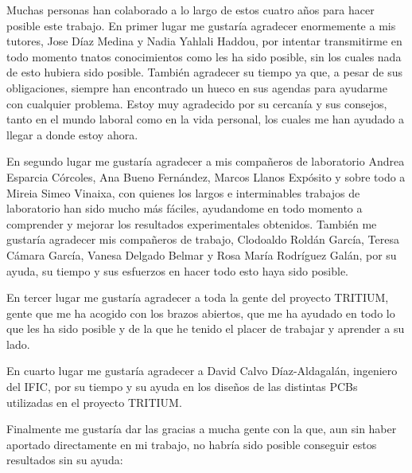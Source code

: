 Muchas personas han colaborado a lo largo de estos cuatro años para hacer posible este trabajo. En primer lugar me gustaría agradecer enormemente a mis tutores, Jose Díaz Medina y Nadia Yahlali Haddou, por intentar transmitirme en todo momento tnatos conocimientos como les ha sido posible, sin los cuales nada de esto hubiera sido posible. También agradecer su tiempo ya que, a pesar de sus obligaciones, siempre han encontrado un hueco en sus agendas para ayudarme con cualquier problema. Estoy muy agradecido por su cercanía y sus consejos, tanto en el mundo laboral como en la vida personal, los cuales me han ayudado a llegar a donde estoy ahora.

En segundo lugar me gustaría agradecer a mis compañeros de laboratorio Andrea Esparcia Córcoles, Ana Bueno Fernández, Marcos Llanos Expósito y sobre todo a Mireia Simeo Vinaixa, con quienes los largos e interminables trabajos de laboratorio han sido mucho más fáciles, ayudandome en todo momento a comprender y mejorar los resultados experimentales obtenidos.  También me gustaría agradecer mis compañeros de trabajo, Clodoaldo Roldán García, Teresa Cámara García, Vanesa Delgado Belmar y Rosa María Rodríguez Galán, por su ayuda, su tiempo y sus esfuerzos en hacer todo esto haya sido posible.

En tercer lugar me gustaría agradecer a toda la gente del proyecto TRITIUM, gente que me ha acogido con los brazos abiertos, que me ha ayudado en todo lo que les ha sido posible y de la que he tenido el placer de trabajar y aprender a su lado.

En cuarto lugar me gustaría agradecer a David Calvo Díaz-Aldagalán, ingeniero del IFIC, por su tiempo y su ayuda en los diseños de las distintas PCBs utilizadas en el proyecto TRITIUM.

Finalmente me gustaría dar las gracias a mucha gente con la que, aun sin haber aportado directamente en mi trabajo, no habría sido posible conseguir estos resultados sin su ayuda:

